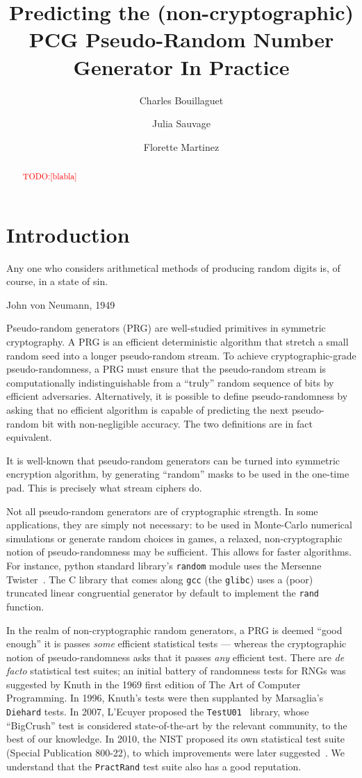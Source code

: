 \documentclass[submission,svgnames,journal=tosc]{iacrtrans}
\title[Predicting the PCG Pseudo-Random Number Generator in Practice]{Predicting the (non-cryptographic) PCG Pseudo-Random Number Generator In Practice}
\author{Charles Bouillaguet\inst{1} \and Julia Sauvage\inst{2} \and Florette Martinez\inst{3}}
\institute{%
University of Lille, France \\ 
\email{charles.bouillaguet@univ-lille.fr}
\and 
Sorbonne University \\
\email{julia.sauvage@etu.upmc.fr}
\and 
LIP6, CNRS, SU ? \\
\email{florette.martinez@lip6.fr}

}
\newcommand{\todo}[1]{\textcolor{red}{TODO:[#1]}}
\begin{document}
\maketitle

\keywords{\todo{keyword}}

\begin{abstract}
  \todo{blabla}
\end{abstract}

\section{Introduction} 

\epigraph{Any one who considers arithmetical methods of producing random digits is, of course, in a state of sin.}{John von Neumann, 1949}

Pseudo-random generators (PRG) are well-studied primitives in symmetric
cryptography. A PRG is an efficient deterministic algorithm that stretch a small
random seed into a longer pseudo-random stream. To achieve cryptographic-grade
pseudo-randomness, a PRG must ensure that the pseudo-random stream is
computationally indistinguishable from a ``truly'' random sequence of bits by
efficient adversaries. Alternatively, it is possible to define pseudo-randomness
by asking that no efficient algorithm is capable of predicting the next
pseudo-random bit with non-negligible accuracy. The two definitions are in fact
equivalent.

It is well-known that pseudo-random generators can be turned into symmetric
encryption algorithm, by generating ``random'' masks to be used in the one-time
pad. This is precisely what stream ciphers do.

Not all pseudo-random generators are of cryptographic strength. In some
applications, they are simply not necessary: to be used in Monte-Carlo
numerical simulations or generate random choices in games, a relaxed,
non-cryptographic notion of pseudo-randomness may be sufficient. This allows for
faster algorithms. For instance, \textsf{python} standard library's
\texttt{random} module uses the Mersenne Twister~\cite{MatsumotoN98}. The
\textsf{C} library that comes along \texttt{gcc} (the \texttt{glibc}) uses a
(poor) truncated linear congruential generator by default to implement the
\texttt{rand} function.

In the realm of non-cryptographic random generators, a PRG is deemed ``good
enough'' it is passes \emph{some} efficient statistical tests --- whereas the
cryptographic notion of pseudo-randomness asks that it passes \emph{any}
efficient test. There are \textit{de facto} statistical test suites; an initial
battery of randomness tests for RNGs was suggested by Knuth in the 1969 first
edition of The Art of Computer Programming. In 1996, Knuth's tests were then
supplanted by Marsaglia's \texttt{Diehard} tests. In 2007, L'Ecuyer proposed
the \texttt{TestU01}~\cite{LEcuyerS07} library, whose ``BigCrush'' test is
considered state-of-the-art by the relevant community, to the best of our
knowledge. In 2010, the NIST proposed its own statistical test suite (Special
Publication 800-22), to which improvements were later
suggested~\cite{ZhuMLZJ16}. We understand that the \texttt{PractRand} test suite
also has a good reputation.
\end{document}
